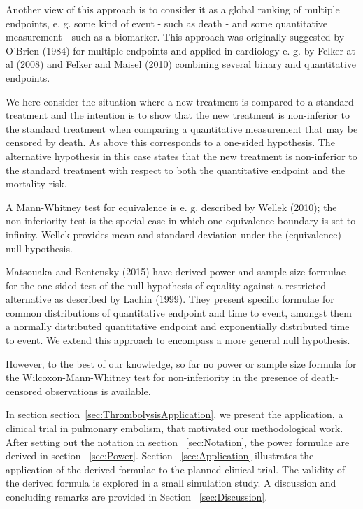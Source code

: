 \documentclass[bimj,fleqn]{w-art}\usepackage[]{graphicx}\usepackage[]{color}
\theoremstyle{plain}
\theoremstyle{definition}
\begin{document}
Another view of this approach is to consider it as a global ranking of
multiple endpoints, e. g. some kind of event - such as death - and some
quantitative measurement - such as a biomarker. This approach was originally
suggested by O'Brien (1984) for multiple endpoints and applied in cardiology
e. g. by Felker at al (2008) and Felker and Maisel (2010) combining several
binary and quantitative endpoints.

We here consider the situation where a new treatment is compared to a standard
treatment and the intention is to show that the new treatment is non-inferior
to the standard treatment when comparing a quantitative measurement that may
be censored by death. As above this corresponds to a one-sided hypothesis.
The alternative hypothesis in this case states that the new treatment is
non-inferior to the standard treatment with respect to both the quantitative
endpoint and the mortality risk.

A Mann-Whitney test for equivalence is e. g. described by Wellek (2010); the
non-inferiority test is the special case in which one equivalence boundary is set
to infinity. Wellek provides mean and standard deviation under the (equivalence)
null hypothesis.

Matsouaka and Bentensky (2015) have derived power and sample size formulae for
the one-sided test of the null hypothesis of equality against a restricted
alternative as described by Lachin (1999). They present specific formulae for
common distributions of quantitative endpoint and time to event, amongst them
a normally distributed quantitative endpoint and exponentially distributed
time to event. We extend this approach to encompass a more general null
hypothesis.

However, to the best of our knowledge, so far no power or sample size formula
for the Wilcoxon-Mann-Whitney test for non-inferiority in the presence of
death-censored observations is available.

In section section~\ref{sec:ThrombolysisApplication}, we present the
application, a clinical trial in pulmonary embolism, that motivated our
methodological work. After setting out the notation in section
~\ref{sec:Notation}, the power formulae are derived in section ~\ref{sec:Power}.
Section ~\ref{sec:Application} illustrates the application of the derived
formulae to the planned clinical trial. The validity of the derived formula
is explored in a small simulation study. A discussion and concluding remarks
are provided in Section ~\ref{sec:Discussion}.
\end{document}
